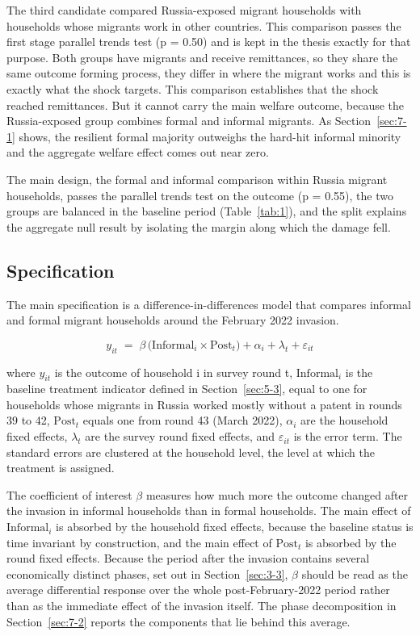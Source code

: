 The third candidate compared Russia-exposed migrant households with households whose migrants work in other countries. This comparison passes the first stage parallel trends test (p = 0.50) and is kept in the thesis exactly for that purpose. Both groups have migrants and receive remittances, so they share the same outcome forming process, they differ in where the migrant works and this is exactly what the shock targets. This comparison establishes that the shock reached remittances. But it cannot carry the main welfare outcome, because the Russia-exposed group combines formal and informal migrants. As Section~\ref{sec:7-1} shows, the resilient formal majority outweighs the hard-hit informal minority and the aggregate welfare effect comes out near zero.

The main design, the formal and informal comparison within Russia migrant households, passes the parallel trends test on the outcome (p = 0.55), the two groups are balanced in the baseline period (Table~\ref{tab:1}), and the split explains the aggregate null result by isolating the margin along which the damage fell.

\subsection{Specification}\label{sec:6-2}

The main specification is a difference-in-differences model that compares informal and formal migrant households around the February 2022 invasion.

\begin{equation}\label{eq:did}
y_{it} \;=\; \beta \,\bigl(\mathrm{Informal}_{i} \times \mathrm{Post}_{t}\bigr) + \alpha_{i} + \lambda_{t} + \varepsilon_{it}
\end{equation}

where $y_{it}$ is the outcome of household i in survey round t, $\mathrm{Informal}_{i}$ is the baseline treatment indicator defined in Section~\ref{sec:5-3}, equal to one for households whose migrants in Russia worked mostly without a patent in rounds 39 to 42, $\mathrm{Post}_{t}$ equals one from round 43 (March 2022), $\alpha_{i}$ are the household fixed effects, $\lambda_{t}$ are the survey round fixed effects, and $\varepsilon_{it}$ is the error term. The standard errors are clustered at the household level, the level at which the treatment is assigned.

The coefficient of interest $\beta$ measures how much more the outcome changed after the invasion in informal households than in formal households. The main effect of $\mathrm{Informal}_{i}$ is absorbed by the household fixed effects, because the baseline status is time invariant by construction, and the main effect of $\mathrm{Post}_{t}$ is absorbed by the round fixed effects. Because the period after the invasion contains several economically distinct phases, set out in Section~\ref{sec:3-3}, $\beta$ should be read as the average differential response over the whole post-February-2022 period rather than as the immediate effect of the invasion itself. The phase decomposition in Section~\ref{sec:7-2} reports the components that lie behind this average.

